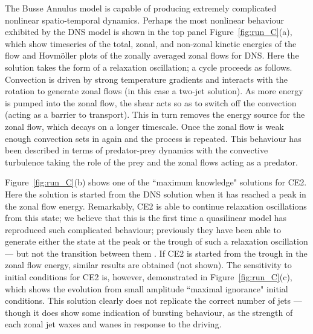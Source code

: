 \documentclass{jfm}
\begin{document}
The Busse Annulus model is capable of producing extremely complicated nonlinear spatio-temporal dynamics. Perhaps the most nonlinear behaviour exhibited by the DNS model is shown in the top panel Figure~\ref{fig:run_C}(a), which show timeseries of the total, zonal, and non-zonal kinetic energies of the flow and Hovm\"oller plots of the zonally averaged zonal flows for DNS. Here the solution takes the form of a relaxation oscillation; a cycle proceeds as follows. Convection is driven by strong temperature gradients and interacts with the rotation to generate zonal flows (in this case a two-jet solution). As more energy is pumped into the zonal flow, the shear acts so as to switch off the convection (acting as a barrier to transport). This in turn removes the energy source for the zonal flow, which decays on a longer timescale. Once the zonal flow is weak enough convection sets in again and the process is repeated. This behaviour has been described in terms of predator-prey dynamics with the convective turbulence taking the role of the prey and the zonal flows acting as a predator. 

Figure~\ref{fig:run_C}(b) shows one of the ``maximum knowledge" solutions for CE2. Here the solution is started from the DNS solution when it has reached a peak in the zonal flow energy. Remarkably, CE2 is able to continue relaxation oscillations from this state; we believe that this is the first time a quasilinear model has reproduced such complicated behaviour; previously they have been able to generate either the state at the peak or the trough of such a relaxation oscillation --- but not the transition between them \citep{pmt_2019}. If CE2 is started from the trough in the zonal flow energy, similar results are obtained (not shown). The sensitivity to initial conditions for CE2 is, however, demonstrated in Figure~\ref{fig:run_C}(c), which shows the evolution from small amplitude ``maximal ignorance" initial conditions. This solution clearly does not replicate the correct number of jets --- though it does show some indication of bursting behaviour, as the strength of each zonal jet waxes and wanes in response to the driving.







\end{document}
